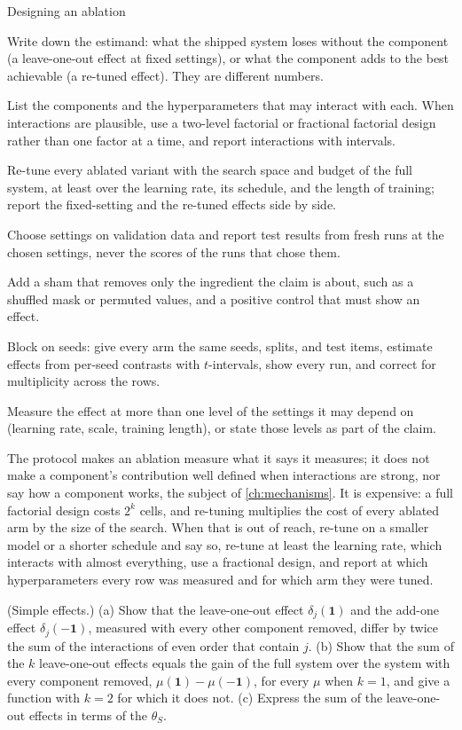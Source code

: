 \begin{refsection}
\begin{protocol}{Designing an ablation}\label{prot:ablations:design}
\item Write down the estimand: what the shipped system loses without the component (a leave-one-out effect at fixed settings), or what the component adds to the best achievable (a re-tuned effect). They are different numbers.
\item List the components and the hyperparameters that may interact with each. When interactions are plausible, use a two-level factorial or fractional factorial design rather than one factor at a time, and report interactions with intervals.
\item Re-tune every ablated variant with the search space and budget of the full system, at least over the learning rate, its schedule, and the length of training; report the fixed-setting and the re-tuned effects side by side.
\item Choose settings on validation data and report test results from fresh runs at the chosen settings, never the scores of the runs that chose them.
\item Add a sham that removes only the ingredient the claim is about, such as a shuffled mask or permuted values, and a positive control that must show an effect.
\item Block on seeds: give every arm the same seeds, splits, and test items, estimate effects from per-seed contrasts with $t$-intervals, show every run, and correct for multiplicity across the rows.
\item Measure the effect at more than one level of the settings it may depend on (learning rate, scale, training length), or state those levels as part of the claim.
\end{protocol}

The protocol makes an ablation measure what it says it measures; it does not make a component's contribution well defined when interactions are strong, nor say how a component works, the subject of \cref{ch:mechanisms}. It is expensive: a full factorial design costs $2^k$ cells, and re-tuning multiplies the cost of every ablated arm by the size of the search. When that is out of reach, re-tune on a smaller model or a shorter schedule and say so, re-tune at least the learning rate, which interacts with almost everything, use a fractional design, and report at which hyperparameters every row was measured and for which arm they were tuned.

\begin{exercises}
\item \consolidation (Simple effects.) (a) Show that the leave-one-out effect $\delta_j(\mathbf 1)$ and the add-one effect $\delta_j(-\mathbf 1)$, measured with every other component removed, differ by twice the sum of the interactions of even order that contain $j$. (b) Show that the sum of the $k$ leave-one-out effects equals the gain of the full system over the system with every component removed, $\mu(\mathbf 1)-\mu(-\mathbf 1)$, for every $\mu$ when $k=1$, and give a function with $k=2$ for which it does not. (c) Express the sum of the leave-one-out effects in terms of the $\theta_S$.\label{ex:ablations:simple}


\end{exercises}
\end{refsection}
